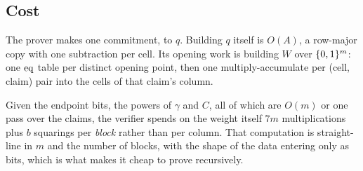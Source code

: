 \subsection{Cost}\label{jag:cost}

The prover makes one commitment, to $q$. Building $q$ itself is $O(A)$, a row-major copy with one subtraction per cell. Its opening work is building $W$ over $\{0,1\}^{m}$: one $\operatorname{eq}$ table per distinct opening point, then one multiply-accumulate per (cell, claim) pair into the cells of that claim's column.

Given the endpoint bits, the powers of $\gamma$ and $C$, all of which are $O(m)$ or one pass over the claims, the verifier spends on the weight itself $7m$ multiplications plus $b$ squarings per \emph{block} rather than per column. That computation is straight-line in $m$ and the number of blocks, with the shape of the data entering only as bits, which is what makes it cheap to prove recursively.
